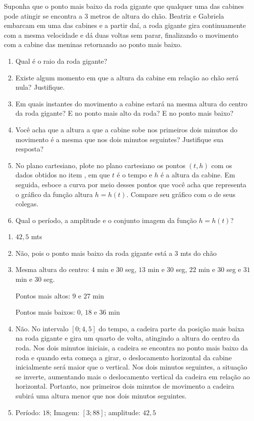 \documentclass[10 pt,usenames,dvipsnames, oneside]{article}
\begin{document}
Suponha que o ponto mais baixo da roda gigante que qualquer uma das cabines pode atingir se encontra a $3$ metros de altura do chão. Beatriz e Gabriela embarcam em uma das cabines e a partir daí, a roda gigante gira continuamente com a mesma velocidade e dá duas voltas sem parar, finalizando o movimento com a cabine das meninas retornando ao ponto mais baixo.

\begin{enumerate}
\item Qual é o raio da roda gigante?
\item Existe algum momento em que a altura da cabine em relação ao chão será nula? Justifique.
\item Em quais instantes do movimento a cabine estará na mesma altura do centro da roda gigante? E no ponto mais alto da roda? E no ponto mais baixo?
\item Você acha que a altura a que a cabine sobe nos primeiros dois minutos do movimento é a mesma que nos dois minutos seguintes? Justifique sua resposta?
\item No plano cartesiano, plote no plano cartesiano os pontos $(t,h)$ com os dados obtidos no item , em que $t$ é o tempo e $h$ é a altura da cabine. Em seguida, esboce a curva por meio desses pontos que você acha que representa o gráfico da função altura $h = h(t)$. Compare seu gráfico com o de seus colegas.
\item Qual o período, a amplitude e o conjunto imagem da função $h = h(t)$?
\end{enumerate}


\ifdefined\prof
\begin{solucao}

\begin{enumerate}
	\item $42{,}5$ mts
	\item Não, pois o ponto mais baixo da roda gigante está a $3$ mts
	do chão
	\item Mesma altura do centro: $4$ min e $30$ seg, $13$ min e $30$ seg,
	$22$ min e $30$ seg e $31$ min e $30$ seg.

	Pontos mais altos: $9$ e $27$ min

	Pontos mais baixos: $0$, $18$ e $36$ min
	\item Não. No intervalo $[0; 4{,}5]$ do tempo, a cadeira parte da
	posição mais baixa na roda gigante e gira um quarto de volta,
	atingindo a altura do centro da roda. Nos dois minutos
	iniciais, a cadeira se encontra no ponto mais baixo da roda e
	quando esta começa a girar, o deslocamento horizontal da
	cabine inicialmente será maior que o vertical. Nos dois
	minutos seguintes, a situação se inverte, aumentando mais o
	deslocamento vertical da cadeira em relação ao horizontal.
	Portanto, nos primeiros dois minutos de movimento a cadeira
	subirá uma altura menor que nos dois minutos seguintes.
	\item Período: $18$; Imagem: $[3;88]$; amplitude: $42{,}5$
	\end{enumerate}

\end{solucao}
\fi
\end{document}
